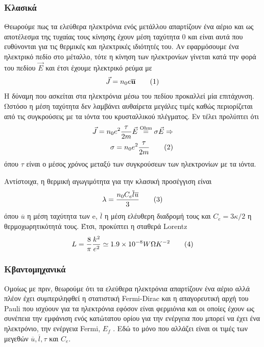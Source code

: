 \documentclass[a4paper]{article}
\newcommand\numberthis{\addtocounter{equation}{1}\tag{\theequation}}
\begin{document}
	 \subsubsection*{Κλασικά}
	 	Θεωρούμε πως τα ελεύθερα ηλεκτρόνια ενός μετάλλου απαρτίζουν ένα αέριο και ως αποτέλεσμα της τυχαίας τους κίνησης έχουν μέση ταχύτητα 0 και είναι αυτά που ευθύνονται για τις θερμικές και ηλεκτρικές ιδιότητές του. Αν εφαρμόσουμε ένα ηλεκτρικό πεδίο στο μέταλλο, τότε η κίνηση των ηλεκτρονίων γίνεται κατά την φορά του πεδίου $\vec{E}$ και έτσι έχουμε ηλεκτρικό ρεύμα με 
	 	\begin{align*}\label{2}
	 		\vec{J} =n_0 e \overline{\textbf{u}} \numberthis
	 	\end{align*}
	 Η δύναμη που ασκείται στα ηλεκτρόνια μέσω του πεδίου προκαλλεί μία επιτάχυνση. Ωστόσο η μέση ταχύτητα δεν λαμβάνει αυθαίρετα μεγάλες τιμές καθώς περιορίζεται από τις συγκρούσεις με τα ιόντα του κρυσταλλικού πλέγματος. Εν τέλει προλύπτει ότι 
	 \begin{align*}\label{3}
	 	\vec{J} = n_0e^2\frac{\tau}{2m}\vec{E} \stackrel{\text{Ohm}}{=} \sigma\vec{E} \Rightarrow \\ 
	 	    \sigma = n_0 e^2\frac{\tau}{2m} \numberthis
	 \end{align*}
	 όπου $\tau$ είναι ο μέσος χρόνος μεταξύ των συγκρούσεων των ηλεκτρονίων με τα ιόντα.
	 
	 Αντίστοιχα, η θερμική αγωγιμότητα για την κλασική προσέγγιση είναι 
	 	\begin{align*}\label{4}
	 		\lambda = \frac{n_0 C_e \overline{l}\overline{u}}{3} \numberthis
	 	\end{align*}
	 	όπου $\overline{u}$ η μέση ταχύτητα των e, $\overline{l}$ η μέση ελέυθερη διαδρομή τους και $C_e=3κ/2$ η θερμοχωρητικότητά τους.
	 Έτσι, προκύπτει η σταθερά Lorentz
	 	\begin{align*}\label{5}
	 		L = \frac{8}{\pi} \frac{k^2}{e^2}\simeq 1.9\times10^{-8} W\Omega K^{-2}  \numberthis
	 	\end{align*}
	 \subsubsection*{Κβαντομηχανικά}
	 
	 Ομοίως με πριν, θεωρούμε ότι τα ελεύθερα ηλεκτρόνια απαρτίζουν ένα αέριο αλλά πλέον έχει συμπεριληφθεί η στατιστική Fermi-Dirac και η απαγορευτική αρχή του Pauli που ισχύουν για τα ηλεκτρόνια εφόσον είναι φερμιόνια και οι οποίες έχουν ως συνέπεια την εμφάνιση ενός κατώτατου ορίου για την ενέργεια που μπορεί να έχει ένα ηλεκτρόνιο, την ενέργεια Fermi, $E_f$	. Εδώ το μόνο που αλλάζει είναι οι τιμές των μεγεθών $\overline{u},\overline{l},\tau $ και $ C_e$.
	 
\end{document}
